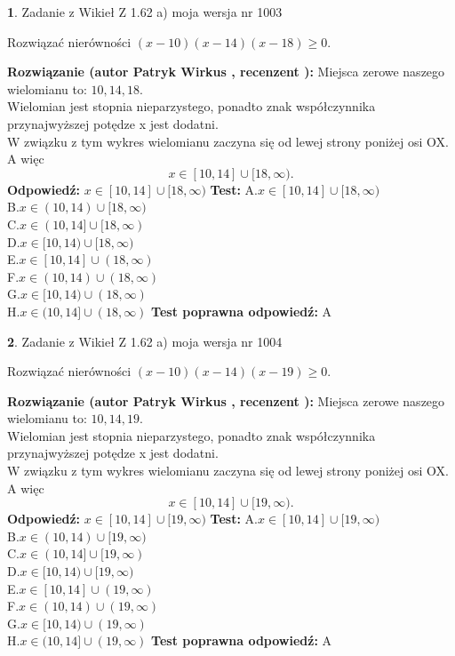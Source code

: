 \documentclass[12pt, a4paper]{article}
\theoremstyle{definition} %
\newtheorem{zad}{}
\newcommand{\zadStart}[1]{\begin{zad}#1\newline}
\newcommand{\zadStop}{\end{zad}}
\newcommand{\rozwStart}[2]{\noindent \textbf{Rozwiązanie (autor #1 , recenzent #2): }\newline}
\newcommand{\rozwStop}{\newline}
\newcommand{\odpStart}{\noindent \textbf{Odpowiedź:}\newline}
\newcommand{\odpStop}{\newline}
\newcommand{\testStart}{\noindent \textbf{Test:}\newline}
\newcommand{\testStop}{\newline}
\newcommand{\kluczStart}{\noindent \textbf{Test poprawna odpowiedź:}\newline}
\newcommand{\kluczStop}{\newline}
\begin{document}
\zadStart{Zadanie z Wikieł Z 1.62 a) moja wersja nr 1003}

Rozwiązać nierówności $(x-10)(x-14)(x-18)\ge0$.
\zadStop
\rozwStart{Patryk Wirkus}{}
Miejsca zerowe naszego wielomianu to: $10, 14, 18$.\\
Wielomian jest stopnia nieparzystego, ponadto znak współczynnika przy\linebreak najwyższej potędze x jest dodatni.\\ W związku z tym wykres wielomianu zaczyna się od lewej strony poniżej osi OX. A więc $$x \in [10,14] \cup [18,\infty).$$
\rozwStop
\odpStart
$x \in [10,14] \cup [18,\infty)$
\odpStop
\testStart
A.$x \in [10,14] \cup [18,\infty)$\\
B.$x \in (10,14) \cup [18,\infty)$\\
C.$x \in (10,14] \cup [18,\infty)$\\
D.$x \in [10,14) \cup [18,\infty)$\\
E.$x \in [10,14] \cup (18,\infty)$\\
F.$x \in (10,14) \cup (18,\infty)$\\
G.$x \in [10,14) \cup (18,\infty)$\\
H.$x \in (10,14] \cup (18,\infty)$
\testStop
\kluczStart
A
\kluczStop



\zadStart{Zadanie z Wikieł Z 1.62 a) moja wersja nr 1004}

Rozwiązać nierówności $(x-10)(x-14)(x-19)\ge0$.
\zadStop
\rozwStart{Patryk Wirkus}{}
Miejsca zerowe naszego wielomianu to: $10, 14, 19$.\\
Wielomian jest stopnia nieparzystego, ponadto znak współczynnika przy\linebreak najwyższej potędze x jest dodatni.\\ W związku z tym wykres wielomianu zaczyna się od lewej strony poniżej osi OX. A więc $$x \in [10,14] \cup [19,\infty).$$
\rozwStop
\odpStart
$x \in [10,14] \cup [19,\infty)$
\odpStop
\testStart
A.$x \in [10,14] \cup [19,\infty)$\\
B.$x \in (10,14) \cup [19,\infty)$\\
C.$x \in (10,14] \cup [19,\infty)$\\
D.$x \in [10,14) \cup [19,\infty)$\\
E.$x \in [10,14] \cup (19,\infty)$\\
F.$x \in (10,14) \cup (19,\infty)$\\
G.$x \in [10,14) \cup (19,\infty)$\\
H.$x \in (10,14] \cup (19,\infty)$
\testStop
\kluczStart
A
\kluczStop
\end{document}
